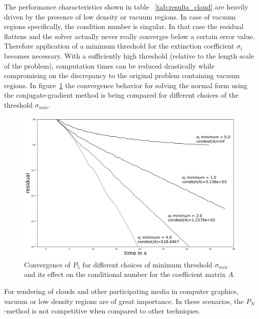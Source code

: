 The performance characteristics shown in table 
~\ref{tab:results_cloud} are heavily driven by the presence of low density or vacuum regions. In case of vacuum regions specifically, the condition number is singular. In that case the residual flattens and the solver actually never really converges below a certain error value. Therefore application of a minimum threshold for the extinction coefficient $\sigma_t$ becomes necessary. With a sufficiently high threshold (relative to the length scale of the problem), computation times can be reduced drastically while compromising on the discrepancy to the original problem containing vacuum regions. In figure~\ref{fig:pn_results_convergence} the convergence behavior for solving the normal form using the conjugate-gradient method is being compared for different choices of the threshold $\sigma_{min}$.
\begin{figure}[h]
\centering
\includegraphics[width=\columnwidth]{04_pn_method/results/fig_nebulae_p1_convergence.pdf}
\caption{Convergence of $P_5$ for different choices of minimum threshold $\sigma_{min}$ and its effect on the conditional number for the coefficient matrix $A$.}
\label{fig:pn_results_convergence}
\end{figure}

For rendering of clouds and other participating media in computer graphics, vacuum or low density regions are of great importance. In these scenarios, the $P_N$-method is not competitive when compared to other techniques.






